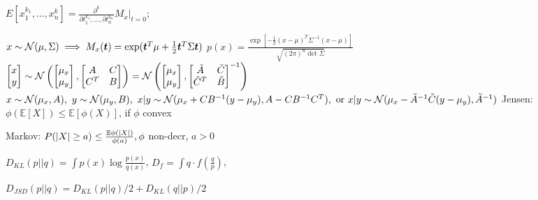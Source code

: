 $E[x_1^{k_1},\dots,x_n^k]=\frac{\partial^k}{\partial t^{k_1}_1,\dots,\partial t^{k_n}_n}M_x\Big|_{t=0}$;

$x\sim\mathcal{N}(\mu,\Sigma)\implies M_x(\boldsymbol{t})=\exp(\boldsymbol{t}^T \mu + \frac{1}{2}\boldsymbol{t}^T\Sigma \boldsymbol{t})$
$p(x)=\frac{\exp[-\frac{1}{2}(x-\mu)^T\Sigma^{-1}(x-\mu)]}{\sqrt{(2\pi)^n\det\Sigma}}$
\\{\footnotesize$
\begin{bmatrix}
x \\
y
\end{bmatrix} \sim \mathcal{N}\left(
\begin{bmatrix}
\mu_x\\
\mu_y
\end{bmatrix},
\begin{bmatrix}
A & C\\
C^T & B
\end{bmatrix}
\right) = \mathcal{N}\left(
\begin{bmatrix}
\mu_x\\
\mu_y
\end{bmatrix},
\begin{bmatrix}
\Tilde{A} & \Tilde{C}\\
\Tilde{C}^T & \Tilde{B}
\end{bmatrix}^{-1}
\right)$}\\
$x \sim \mathcal{N}(\mu_x, A),\ y \sim \mathcal{N}(\mu_y, B),\ x|y \sim \mathcal{N}(\mu_x + CB^{-1}(y-\mu_y), A- CB^{-1}C^T),\text{ or } x|y \sim \mathcal{N}(\mu_x - \Tilde{A}^{-1}\Tilde{C}(y - \mu_y), \Tilde{A}^{-1})$
Jensen: $\phi(\mathbb{E}[X])\leq \mathbb{E}[\phi(X)]$, if $\phi$ convex

Markov: $P(|X|\ge a)\le \frac{\mathbb{E}\phi(|X|)}{\phi(a)},\phi$ non-decr, $a>0$

 $D_{KL}(p||q)=\int p(x)\log\frac{p(x)}{q(x)}$, $D_f=\int q \cdot f(\frac{q}{p})$,
 
 $D_{JSD}(p||q)=D_{KL}(p||q)/2+D_{KL}(q||p)/2$ 